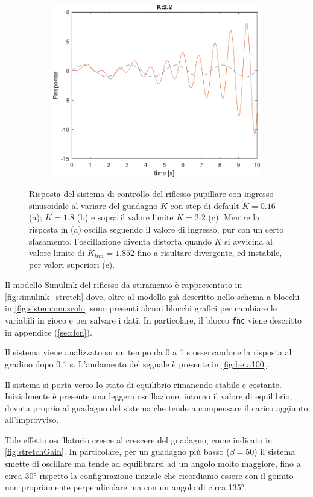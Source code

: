 \begin{figure}[t!]
\begin{subfigure}{0.33\linewidth}
		\includegraphics[width=0.95\linewidth]{../code/pupillary/sine/figs/result_gain_2.2}
		\caption{}
	\end{subfigure}\hfill
	\caption{Risposta del sistema di controllo del riflesso pupillare con ingresso sinusoidale al variare del guadagno $K$ con step di default $K=0.16$ (a); $K=1.8$ (b) e sopra il valore limite $K=2.2$ (c). Mentre la risposta in (a) oscilla seguendo il valore di ingresso, pur con un certo sfasamento, l'oscillazione diventa distorta quando $K$ si avvicina al valore limite di $K_{lim}=1.852$ fino a risultare divergente, ed instabile, per valori superiori (c).}
\end{figure}

Il modello Simulink del riflesso da stiramento è rappresentato in \cref{fig:simulink_stretch} dove, oltre al modello già descritto nello schema a blocchi in \cref{fig:sistemamuscolo} sono presenti alcuni blocchi grafici per cambiare le variabili in gioco e per salvare i dati. In particolare, il blocco \texttt{fnc} viene descritto in appendice (\cref{sec:fcn}).

Il sistema viene analizzato su un tempo da 0 a 1 s osservandone la risposta al gradino dopo 0.1 s. L'andamento del segnale è presente in \cref{fig:beta100}.

Il sistema si porta verso lo stato di equilibrio rimanendo stabile e costante. Inizialmente è presente una leggera oscillazione, intorno il valore di equilibrio, dovuta proprio al guadagno del sistema che tende a compensare il carico aggiunto all'improvviso. 

Tale effetto oscillatorio cresce al crescere del guadagno, come indicato in \cref{fig:stretchGain}.
In particolare, per un guadagno più basso ($\beta =50$) il sistema smette di oscillare ma tende ad equilibrarsi ad un angolo molto maggiore, fino a circa 30° rispetto la configurazione iniziale che ricordiamo essere con il gomito non propriamente perpendicolare ma con un angolo di circa 135°.

